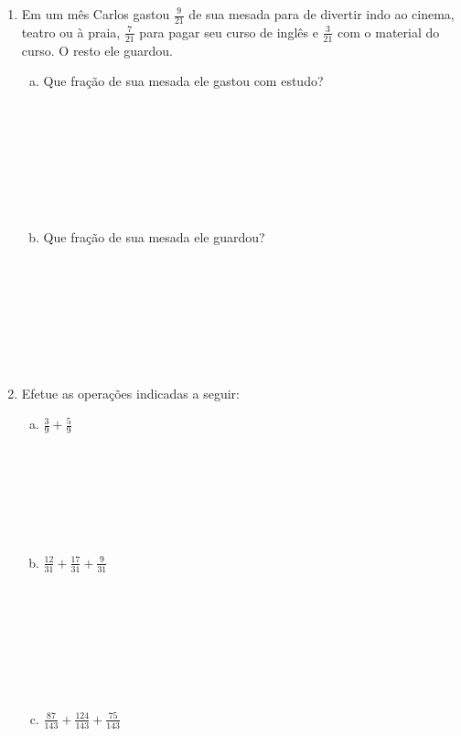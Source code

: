 \documentclass[a4paper,14pt]{article}
\begin{document}
\begin{multicols}{2}
\begin{enumerate}
			\item Em um mês Carlos gastou $\frac{9}{21}$ de sua mesada para de divertir indo ao cinema, teatro ou à praia, $\frac{7}{21}$ para pagar seu curso de inglês e $\frac{3}{21}$ com o material do curso. O resto ele guardou. \\
			\begin{enumerate}[a)]
				\item Que fração de sua mesada ele gastou com estudo? \\\\\\\\\\\\\\\\
				\item Que fração de sua mesada ele guardou? \\\\\\\\\\\\\\\\
			\end{enumerate}
			\item Efetue as operações indicadas a seguir:
			\begin{enumerate}[a)]
				\item $\frac{3}{9} + \frac{5}{9}$ \\\\\\\\\\\\\\
				\item $\frac{12}{31} + \frac{17}{31} + \frac{9}{31}$ \\\\\\\\\\\\\\\\
				\item $\frac{87}{143} + \frac{124}{143} + \frac{75}{143}$ \\\\\\\\\\\\\\\\

\end{enumerate}
\end{enumerate}
\end{multicols}
\end{document}
